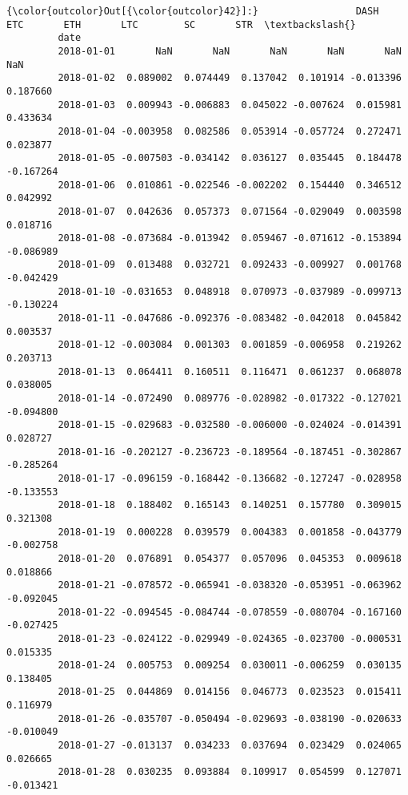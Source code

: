 \documentclass[11pt]{article}
\begin{document}
\begin{Verbatim}[commandchars=\\\{\}]
{\color{outcolor}Out[{\color{outcolor}42}]:}                 DASH       ETC       ETH       LTC        SC       STR  \textbackslash{}
         date                                                                     
         2018-01-01       NaN       NaN       NaN       NaN       NaN       NaN   
         2018-01-02  0.089002  0.074449  0.137042  0.101914 -0.013396  0.187660   
         2018-01-03  0.009943 -0.006883  0.045022 -0.007624  0.015981  0.433634   
         2018-01-04 -0.003958  0.082586  0.053914 -0.057724  0.272471  0.023877   
         2018-01-05 -0.007503 -0.034142  0.036127  0.035445  0.184478 -0.167264   
         2018-01-06  0.010861 -0.022546 -0.002202  0.154440  0.346512  0.042992   
         2018-01-07  0.042636  0.057373  0.071564 -0.029049  0.003598  0.018716   
         2018-01-08 -0.073684 -0.013942  0.059467 -0.071612 -0.153894 -0.086989   
         2018-01-09  0.013488  0.032721  0.092433 -0.009927  0.001768 -0.042429   
         2018-01-10 -0.031653  0.048918  0.070973 -0.037989 -0.099713 -0.130224   
         2018-01-11 -0.047686 -0.092376 -0.083482 -0.042018  0.045842  0.003537   
         2018-01-12 -0.003084  0.001303  0.001859 -0.006958  0.219262  0.203713   
         2018-01-13  0.064411  0.160511  0.116471  0.061237  0.068078  0.038005   
         2018-01-14 -0.072490  0.089776 -0.028982 -0.017322 -0.127021 -0.094800   
         2018-01-15 -0.029683 -0.032580 -0.006000 -0.024024 -0.014391  0.028727   
         2018-01-16 -0.202127 -0.236723 -0.189564 -0.187451 -0.302867 -0.285264   
         2018-01-17 -0.096159 -0.168442 -0.136682 -0.127247 -0.028958 -0.133553   
         2018-01-18  0.188402  0.165143  0.140251  0.157780  0.309015  0.321308   
         2018-01-19  0.000228  0.039579  0.004383  0.001858 -0.043779 -0.002758   
         2018-01-20  0.076891  0.054377  0.057096  0.045353  0.009618  0.018866   
         2018-01-21 -0.078572 -0.065941 -0.038320 -0.053951 -0.063962 -0.092045   
         2018-01-22 -0.094545 -0.084744 -0.078559 -0.080704 -0.167160 -0.027425   
         2018-01-23 -0.024122 -0.029949 -0.024365 -0.023700 -0.000531  0.015335   
         2018-01-24  0.005753  0.009254  0.030011 -0.006259  0.030135  0.138405   
         2018-01-25  0.044869  0.014156  0.046773  0.023523  0.015411  0.116979   
         2018-01-26 -0.035707 -0.050494 -0.029693 -0.038190 -0.020633 -0.010049   
         2018-01-27 -0.013137  0.034233  0.037694  0.023429  0.024065  0.026665   
         2018-01-28  0.030235  0.093884  0.109917  0.054599  0.127071 -0.013421   

\end{Verbatim}
\end{document}
